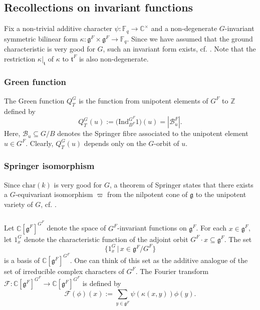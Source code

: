 \documentclass[12pt]{amsart}
\theoremstyle{plain}
\theoremstyle{definition}
\theoremstyle{remark}
\newcommand{\ra}{\rightarrow}
\newcommand{\bC}{\mathbb{C}}
\newcommand{\bCt}{\mathbb{C}^\times}
\newcommand{\fg}{\mathfrak{g}}
\newcommand{\ft}{\mathfrak{t}}
\begin{document}
\subsection{Recollections on invariant functions}  \label{s:invariant} 
Fix a non-trivial additive character $\psi: \mathbb{F}_q\ra \bCt$ and a  non-degenerate $G$-invariant symmetric bilinear form $\kappa: \fg^F\times \fg^F\ra \mathbb{F}_q$. Since we have assumed that the ground characteristic is very good for $G$, such an invariant form exists, cf. \cite[Proposition 2.5.12]{Letellier05}.   Note that the restriction $\kappa|_{\ft}$ of $\kappa$ to $\ft^F$ is  also non-degenerate.


\subsubsection{Green function} The Green function $Q_T^G$ is the function from unipotent elements of $G^F$ to $\mathbb{Z}$ defined by
\[
Q_{T}^{G}(u):=\Big(\mathrm{Ind}_{B^F}^{G^F} 1\Big) (u)=|\mathcal{B}_u^F|.  
\]
Here, $\mathcal{B}_u\subseteq G/B$ denotes the Springer fibre associated to the unipotent element $u\in G^F$. Clearly, $Q_T^G(u)$ depends only on the $G$-orbit of $u$. 






\subsubsection{Springer isomorphism} 
Since $\mathrm{char}(k)$ is very good for $G$, 
a theorem of Springer states that there exists  a $G$-equivariant isomorphism $\varpi$ from the nilpotent cone of $\fg$ to the unipotent variety of $G$, cf. \cite[\S 2.7.5]{Letellier05}. 

\subsubsection{} Let $\bC[\fg^F]^{G^F}$ denote the space of $G^F$-invariant functions on $\fg^F$. For each $x\in \fg^F$, let $1_x^G$ denote the characteristic function of the adjoint orbit $G^F\cdot x\subseteq \fg^F$. The set 
\[
{\{1_x^G\, |\, x\in \fg^F/G^F\}}
\] 
is a basis of $\bC[\fg^F]^{G^F}$. One can think of this set as the additive analogue of the set of irreducible complex characters of $G^F$.  The Fourier transform $ \mathcal{F}:\bC[\fg^F]^{G^F}\ra \bC[\fg^F]^{G^F}$ is defined by 
\[
\mathcal{F}(\phi)(x):=\sum_{y\in \fg^F} \psi(\kappa(x,y))\phi(y). 
\]
\end{document}
